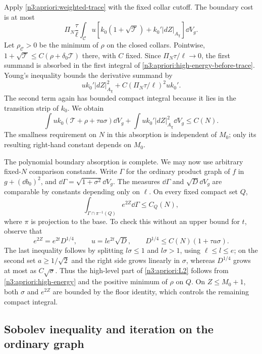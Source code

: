 Apply \eqref{n3:apriori:weighted-trace} with the fixed collar cutoff.
The boundary cost is at most
\[
 \Pi_N\frac\tau\ell\int_{\mathcal C}u
       \left[k_0(1+\sqrt{\mathcal T})
                              +k_0'|dZ|_{A_\chi}\right]\dd V_g.
\]
Let $\rho_{\mathcal C}>0$ be the minimum of $\rho$ on the closed
collars.  Pointwise,
$1+\sqrt{\mathcal T}\le C(\rho+\delta_0\mathcal T)$ there, with
$C$ fixed.  Since $\Pi_N\tau/\ell\to0$, the first summand is
absorbed in the first integral of
\eqref{n3:apriori:high-energy-before-trace}.  Young's inequality bounds
the derivative summand by
\[
 u k_0'|dZ|_{A_\chi}^2+
          C(\Pi_N\tau/\ell)^2u k_0'.
\]
The second term again has bounded compact integral because it lies
in the transition strip of $k_0$.  We obtain
\begin{equation}
 \int u k_0(\mathcal T+\rho+\tau a\sigma)\dd V_g
       +\int u k_0'|dZ|_{A_\chi}^2\dd V_g\le C(N).
 \label{n3:apriori:high-energy}
\end{equation}
The smallness requirement on $N$ in this absorption is independent
of $M_0$; only its resulting right-hand constant depends on $M_0$.

The polynomial boundary absorption is complete. We may now use
arbitrary fixed-$N$ comparison constants. Write
$\Gamma$ for the ordinary product graph of $f$ in $g+(\dd b_0)^2$,
and $\dd\Gamma=\sqrt{1+\sigma^2}\dd V_g$.  The measures
$\dd\Gamma$ and $\sqrt D\dd V_g$ are comparable by constants
depending only on $\ell$.  On every fixed compact set $Q$,
\begin{equation}
 \int_{\Gamma\cap\pi^{-1}(Q)}e^{2Z}\dd\Gamma\le C_Q(N),
 \label{n3:apriori:L2}
\end{equation}
where $\pi$ is projection to the base.  To check this without an
upper bound for $t$, observe that
\[
 e^{2Z}=e^{2t}D^{1/4},\qquad u=le^{2t}\sqrt D,
 \qquad D^{1/4}\le C(N)(1+\tau a\sigma).
\]
The last inequality follows by splitting $l\sigma\le1$ and
$l\sigma>1$, using $\ell\le l\le e$; on the second set
$a\ge1/\sqrt2$ and the right side grows linearly in $\sigma$,
whereas $D^{1/4}$ grows at most as $C\sqrt\sigma$.
Thus the high-level part of \eqref{n3:apriori:L2} follows from
\eqref{n3:apriori:high-energy} and the positive minimum of $\rho$ on
$Q$.  On $Z\le M_0+1$, both $\sigma$ and $e^{2Z}$ are bounded
by the floor identity, which controls the remaining compact integral.

\subsection{Sobolev inequality and iteration on the ordinary graph}

